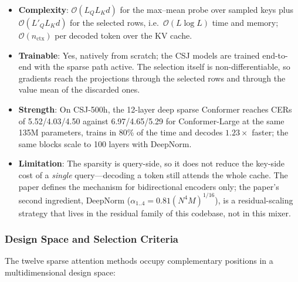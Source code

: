 \begin{itemize}[leftmargin=*]
    \item \textbf{Complexity}: $\mathcal{O}(L_Q L_K d)$ for the max--mean probe over sampled keys plus $\mathcal{O}(L'_Q L_K d)$ for the selected rows, i.e.\ $\mathcal{O}(L\log L)$ time and memory; $\mathcal{O}(n_{\text{ctx}})$ per decoded token over the KV cache.
    \item \textbf{Trainable}: Yes, natively from scratch; the CSJ models are trained end-to-end with the sparse path active. The selection itself is non-differentiable, so gradients reach the projections through the selected rows and through the value mean of the discarded ones.
    \item \textbf{Strength}: On CSJ-500h, the 12-layer deep sparse Conformer reaches CERs of 5.52/4.03/4.50 against 6.97/4.65/5.29 for Conformer-Large at the same 135M parameters, trains in 80\% of the time and decodes $1.23\times$ faster; the same blocks scale to 100 layers with DeepNorm.
    \item \textbf{Limitation}: The sparsity is query-side, so it does not reduce the key-side cost of a \emph{single} query---decoding a token still attends the whole cache. The paper defines the mechanism for bidirectional encoders only; the paper's second ingredient, DeepNorm ($\alpha_{1..4}=0.81(N^4M)^{1/16}$), is a residual-scaling strategy that lives in the residual family of this codebase, not in this mixer.
\end{itemize}

\subsubsection{Design Space and Selection Criteria}

The twelve sparse attention methods occupy complementary positions in a multidimensional design space:

